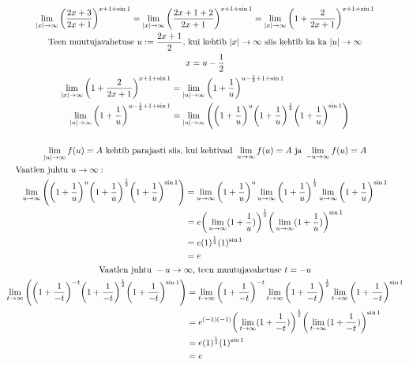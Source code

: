 \documentclass{article}
\begin{document}
\begin{gather*}
\lim_{|x|\to\infty} \bigg( \frac{2x+3}{2x+1}\bigg)^{x+1+\sin 1}=\lim_{|x|\to\infty} \bigg( \frac{2x+1+2}{2x+1}\bigg)^{x+1+\sin 1}=\lim_{|x|\to\infty} \bigg(1+ \frac{2}{2x+1}\bigg)^{x+1+\sin 1}\\
\text{Teen muutujavahetuse } u:=\frac{2x+1}{2}\text{, kui kehtib }|x|\to\infty\text{ siis kehtib ka ka }|u|\to\infty\\
x=u-\frac{1}{2}\\
\begin{aligned}
\lim_{|x|\to\infty} \bigg(1+ \frac{2}{2x+1}\bigg)^{x+1+\sin 1}&=\lim_{|u|\to\infty} \bigg(1+ \frac{1}{u}\bigg)^{u-\frac{1}{2}+1+\sin 1}\\
\lim_{|u|\to\infty} \bigg(1+ \frac{1}{u}\bigg)^{u-\frac{1}{2}+1+\sin 1}&=\lim_{|u|\to\infty} \Bigg(\bigg(1+ \frac{1}{u}\bigg)^u\bigg(1+ \frac{1}{u}\bigg)^\frac{1}{2}\bigg(1+ \frac{1}{u}\bigg)^{\sin1}\Bigg)\\
\end{aligned}\\\\
\lim_{|u|\to\infty}f(u)=A\text{ kehtib parajasti siis, kui kehtivad } \lim_{u\to\infty}f(u)=A \text{ ja } \lim_{-u\to\infty}f(u)=A\\
\shoveleft{\text{Vaatlen juhtu }u\to\infty:}\\
\begin{aligned}
\lim_{u\to\infty} \Bigg(\bigg(1+ \frac{1}{u}\bigg)^u\bigg(1+ \frac{1}{u}\bigg)^\frac{1}{2}\bigg(1+ \frac{1}{u}\bigg)^{\sin1}\Bigg)&=\lim_{u\to\infty} \bigg(1+ \frac{1}{u}\bigg)^u\lim_{u\to\infty}\bigg(1+ \frac{1}{u}\bigg)^\frac{1}{2}\lim_{u\to\infty}\bigg(1+ \frac{1}{u}\bigg)^{\sin1}\\
&=e\bigg(\lim_{u\to\infty}(1+ \frac{1}{u})\bigg)^\frac{1}{2}\bigg(\lim_{u\to\infty}(1+ \frac{1}{u})\bigg)^{\sin1}\\
&=e(1)^\frac{1}{2}(1)^{\sin1}\\
&=e
\end{aligned}\\
\text{Vaatlen juhtu }-u\to\infty\text{, teen muutujavahetuse }t=-u\\
\begin{aligned}
\lim_{t\to\infty} \Bigg(\bigg(1+ \frac{1}{-t}\bigg)^{-t}\bigg(1+ \frac{1}{-t}\bigg)^\frac{1}{2}\bigg(1+ \frac{1}{-t}\bigg)^{\sin1}\Bigg)&=\lim_{t\to\infty} \bigg(1+ \frac{1}{-t}\bigg)^{-t}\lim_{t\to\infty}\bigg(1+ \frac{1}{-t}\bigg)^\frac{1}{2}\lim_{t\to\infty}\bigg(1+ \frac{1}{-t}\bigg)^{\sin1}\\
&=e^{(-1)(-1)}\bigg(\lim_{t\to\infty}(1+ \frac{1}{-t})\bigg)^\frac{1}{2}\bigg(\lim_{t\to\infty}(1+ \frac{1}{-t})\bigg)^{\sin1}\\
&=e(1)^\frac{1}{2}(1)^{\sin1}\\
&=e
\end{aligned}
\end{gather*}
\end{document}
